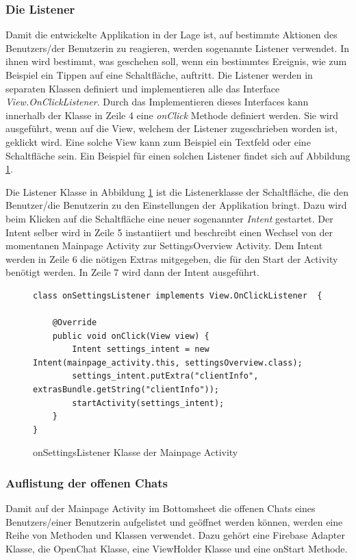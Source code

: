\documentclass[a4paper,11pt]{report}
\begin{document}
			\subsubsection{Die Listener}
			Damit die entwickelte Applikation in der Lage ist, auf bestimmte Aktionen des Benutzers/der Benutzerin zu reagieren, werden sogenannte Listener verwendet. In ihnen wird bestimmt, was geschehen soll, wenn ein bestimmtes Ereignis, wie zum Beispiel ein Tippen auf eine Schaltfläche, auftritt. Die Listener werden in separaten Klassen definiert und implementieren alle das Interface \emph{View.OnClickListener}. Durch das Implementieren dieses Interfaces kann innerhalb der Klasse in Zeile 4 eine \emph{onClick} Methode definiert werden. Sie wird ausgeführt, wenn auf die View, welchem der Listener zugeschrieben worden ist, geklickt wird. Eine solche View kann zum Beispiel ein Textfeld oder eine Schaltfläche sein. Ein Beispiel für einen solchen Listener findet sich auf Abbildung \ref{java:listener}.
			
			Die Listener Klasse in Abbildung \ref{java:listener} ist die Listenerklasse der Schaltfläche, die den Benutzer/die Benutzerin zu den Einstellungen der Applikation bringt. Dazu wird beim Klicken auf die Schaltfläche eine neuer sogenannter \emph{Intent} gestartet. Der Intent selber wird in Zeile 5 instantiiert und beschreibt einen Wechsel von der momentanen Mainpage Activity zur SettingsOverview Activity. Dem Intent werden in Zeile 6 die nötigen Extras mitgegeben, die für den Start der Activity benötigt werden. In Zeile 7 wird dann der Intent ausgeführt.
\begin{figure}
	\begin{center}
		\begin{verbatim}
class onSettingsListener implements View.OnClickListener  {

	@Override
	public void onClick(View view) {
		Intent settings_intent = new Intent(mainpage_activity.this, settingsOverview.class);
		settings_intent.putExtra("clientInfo", extrasBundle.getString("clientInfo"));
		startActivity(settings_intent);
	}
}
		\end{verbatim}
		\caption{onSettingsListener Klasse der Mainpage Activity}\label{java:listener}
	\end{center}

\end{figure}
			
			\subsubsection{Auflistung der offenen Chats}
			Damit auf der Mainpage Activity im Bottomsheet die offenen Chats eines Benutzers/einer Benutzerin aufgelistet und geöffnet werden können, werden eine Reihe von Methoden und Klassen verwendet. Dazu gehört eine Firebase Adapter Klasse, die OpenChat Klasse, eine ViewHolder Klasse und eine onStart Methode. 
			
\end{document}
